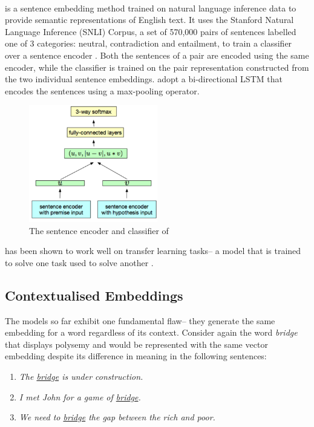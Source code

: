 \paragraph{\infersent}
\infersent \citep{Conneau2017} is a sentence embedding method trained on natural language inference data to provide semantic representations of English text. It uses the Stanford Natural Language Inference (SNLI) Corpus, a set of 570,000 pairs of sentences labelled one of 3 categories: neutral, contradiction and entailment, to train a classifier over a sentence encoder . Both the sentences of a pair are encoded using the same encoder, while the classifier is trained on the pair representation constructed from the two individual sentence embeddings. \cite{Conneau2017} adopt a bi-directional LSTM that encodes the sentences using a max-pooling operator.
\begin{figure}[h!]
\begin{center}
\includegraphics[width=0.5\textwidth]{Figures/InferSent.PNG}
\caption{The sentence encoder and classifier of \infersent \citep{Conneau2017}}
\label{fig:inferSent}
\end{center}
\end{figure}
\infersent has been shown to work well on transfer learning tasks-- a model that is trained to solve one task used to solve another \citep{Conneau2017}.

\subsection{Contextualised Embeddings}
The models so far exhibit one fundamental flaw-- they generate the same embedding for a word regardless of  its context. Consider again the word \textit{bridge} that displays polysemy and would be represented with the same vector embedding despite its difference in meaning in the following sentences:
\begin{enumerate}
\item \textit{The \underline{bridge} is under construction.}
\item \textit{I met John for a game of \underline{bridge}.}
\item \textit{We need to \underline{bridge} the gap between the rich and poor.}
\end{enumerate}

